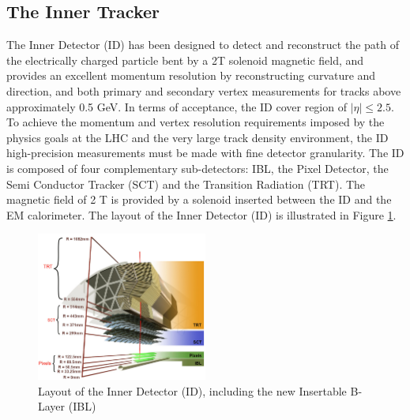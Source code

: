 \subsection{The Inner Tracker}
\label{chap2:ATLAS:ITk}
The Inner Detector (ID) has been designed to detect and reconstruct the path of the electrically charged particle bent by a 2T solenoid magnetic field, and provides an excellent momentum  resolution by reconstructing curvature and direction, and both primary and secondary vertex measurements for tracks above approximately 0.5 GeV. In terms of acceptance, the ID cover region of $|\eta|\leqslant2.5$. To achieve the momentum and vertex resolution requirements imposed by the physics goals at the LHC and the very large track density environment, the ID high-precision measurements must be made with fine detector granularity. The ID is composed of four complementary sub-detectors: IBL, the Pixel Detector, the Semi Conductor Tracker (SCT) and the Transition Radiation (TRT). The magnetic field of 2 T is provided by a solenoid inserted between the ID and the EM calorimeter. The layout of the Inner Detector (ID) is illustrated in Figure \ref{fig:chap2:ATLAS:ITK:ID}.
\begin{figure}[H]
    \centering
    \includegraphics[width=0.5\textwidth]{Ch2/Img/ID_withIBL.png}
    \caption{Layout of the Inner Detector (ID), including the new Insertable B-Layer (IBL)}
    \label{fig:chap2:ATLAS:ITK:ID}
\end{figure}
